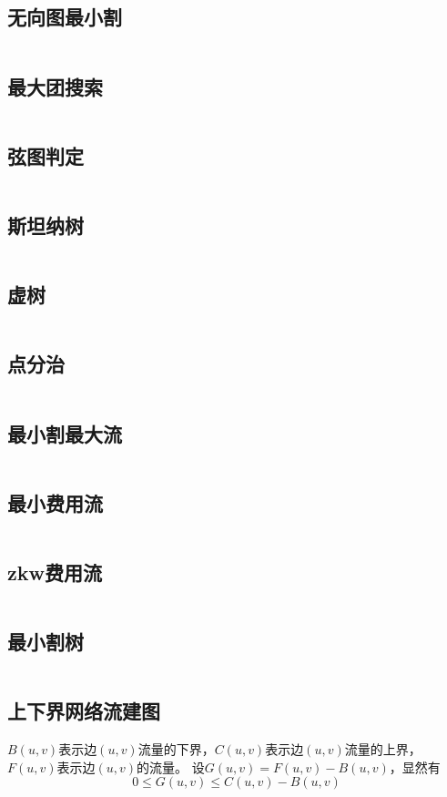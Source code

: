 \subsection{无向图最小割}
\inputminted{cpp}{\source/graph-theory/stoer-wagner-algorithm.cpp}
\subsection{最大团搜索}
\inputminted{cpp}{\source/graph-theory/maxclique.cpp}
\subsection{弦图判定}
\inputminted{cpp}{\source/graph-thery/judge.cpp}
\subsection{斯坦纳树}
\inputminted{cpp}{\source/graph-theory/Steiner-Tree.cpp}
\subsection{虚树}
\inputminted{cpp}{\source/graph-theory/mirage-tree.cpp}
\subsection{点分治}
\inputminted{cpp}{\source/graph-theory/vertex-partition.cpp}
\subsection{最小割最大流}
\inputminted{cpp}{\source/graph-theory/dinic.cpp}
\subsection{最小费用流}
\inputminted{cpp}{\source/graph-theory/mincost-maxflow.cpp}
\subsection{zkw费用流}
\inputminted{cpp}{\source/graph-theory/zkw-cost-flow.cpp}
\subsection{最小割树}
\inputminted{cpp}{\source/graph-theory/GH-tree.cpp}
\subsection{上下界网络流建图}
$B(u,v)$表示边$(u,v)$流量的下界，$C(u,v)$表示边$(u,v)$流量的上界，$F(u,v)$表示边$(u,v)$的流量。
设$G(u,v) = F(u,v) - B(u,v)$，显然有
$$0 \leq G(u,v) \leq C(u,v)-B(u,v)$$
